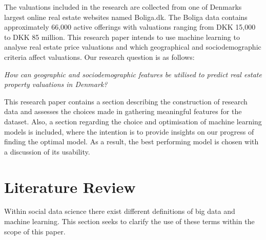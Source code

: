 \documentclass[12pt,a4paper]{article}
\begin{document}
The valuations included in the research are collected from one of Denmarks largest online real estate websites named Boliga.dk. The Boliga data contains approximately 66,000 active offerings with valuations ranging from DKK 15,000 to DKK 85 million. This research paper intends to use machine learning to analyse real estate price valuations and which geographical and sociodemographic criteria affect valuations. Our research question is as follows: 
\begin{center}
 \textit{How can geographic and sociodemographic features be utilised to predict real estate property valuations in Denmark?}
\end{center}
This research paper contains a section describing the construction of research data and assesses the choices made in gathering meaningful features for the dataset. Also, a section regarding the choice and optimisation of machine learning models is included, where the intention is to provide insights on our progress of finding the optimal model. As a result, the best performing model is chosen with a discussion of its usability. 

\section{Literature Review}
Within social data science there exist different definitions of big data and machine learning. This section seeks to clarify the use of these terms within the scope of this paper.
\end{document}
